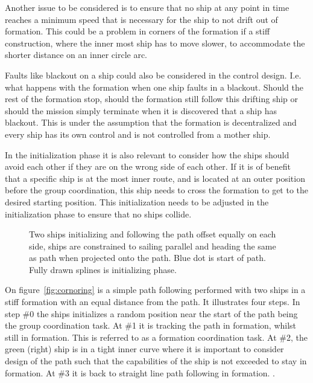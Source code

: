 Another issue to be considered is to ensure that no ship at
any point in time reaches a minimum speed that is necessary for the
ship to not drift out of formation. This could be a problem in corners
of the formation if a stiff construction, where the inner most ship
has to move slower, to accommodate the shorter distance on an inner
circle arc.

Faults like blackout on a ship could also be considered in the control
design. I.e. what happens with the formation when one ship faults in a
blackout. Should the rest of the formation stop, should the formation
still follow this drifting ship or should the mission simply terminate
when it is discovered that a ship has blackout. This is under the assumption that the formation is decentralized and every ship has its own control and is not controlled from a mother ship.

In the initialization phase it is also relevant to consider how the
ships should avoid each other if they are on the wrong side of each
other. If it is of benefit that a specific ship is at the most inner route, and is located at an outer position before the group coordination, this ship needs to cross the formation to get to the desired starting position. This initialization needs to be adjusted in the initialization phase to ensure that no ships collide.

\begin{figure}[htbp]
	\centering
	
	\caption{Two ships initializing and following the path offset
		equally on each side, ships are constrained to sailing parallel
		and heading the same as path when projected onto the path. Blue
	dot is start of path. Fully drawn splines is initializing phase.}
	\label{fig:cornoring}
\end{figure}

On figure~\vref{fig:cornoring} is a simple path following performed
with two ships in a stiff formation with an equal distance from the
path. It illustrates four steps. In step \#0 the ships initializes a
random position near the start of the path being the group coordination task. At \#1 it is tracking the
path in formation, whilst still in formation. This is referred to as a formation coordination task. At \#2, the green
(right) ship is in a tight inner curve where it is important to
consider design of the path such that the capabilities of the ship is not
exceeded to stay in formation. At \#3 it is back to straight line path
following in formation. \citep{thorvaldsen}.

